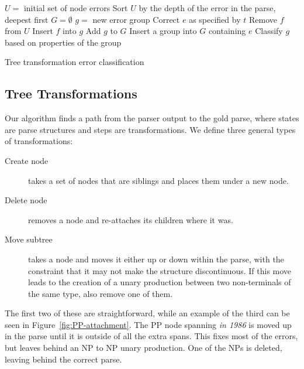 \begin{algorithm}[t]
\begin{algorithmic}
\State $U =$ initial set of node errors
\State Sort $U$ by the depth of the error in the parse, deepest first
\State $G = \emptyset$
\Repeat
			\State $g =$ new error group
			\State Correct $e$ as specified by $t$
				\State Remove $f$ from $U$
				\State Insert $f$ into $g$
			\EndFor
			\State Add $g$ to $G$
		\EndIf
	\EndFor
{}
	\State Insert a group into $G$ containing $e$
\EndFor
{}
	\State Classify $g$ based on properties of the group
\EndFor
\end{algorithmic}
\caption{ \label{alg:code}
	Tree transformation error classification
}
\end{algorithm}

\subsection{Tree Transformations} \label{sec:tree-transform}

Our algorithm finds a path from the parser output to the gold parse, where states are parse structures and steps are transformations.
We define three general types of transformations:

\begin{description}
  \item[Create node] takes a set of nodes that are siblings and places them under a new node.
  \item[Delete node] removes a node and re-attaches its children where it was.
  \item[Move subtree] takes a node and moves it either up or down within the parse, with the constraint that it may not make the structure discontinuous. If this move leads to the creation of a unary production between two non-terminals of the same type, also remove one of them.
\end{description}

The first two of these are straightforward, while an example of the third can be seen in Figure~\ref{fig:PP-attachment}.
The PP node spanning \emph{in 1986} is moved up in the parse until it is outside of all the extra spans.
This fixes most of the errors, but leaves behind an NP to NP unary production.
One of the NPs is deleted, leaving behind the correct parse.

